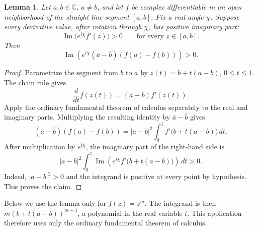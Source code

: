 \documentclass[11pt,a4paper]{article}
\newtheorem{lemma}[theorem]{Lemma}
\theoremstyle{definition}
\theoremstyle{remark}
\numberwithin{equation}{section}
\begin{document}
\begin{lemma}\label{thm:sector-difference}
Let $a,b\in\mathbb C$, $a\ne b$, and let $f$ be complex differentiable in an open neighborhood of the straight line segment $[a,b]$. Fix a real angle $\chi$. Suppose every derivative value, after rotation through $\chi$, has positive imaginary part:
\[
 \operatorname{Im}\bigl(e^{i\chi}f'(z)\bigr)>0
 \qquad\text{for every }z\in[a,b].
\]
Then
\[
 \operatorname{Im}\!\left(e^{i\chi}
          (\bar a-\bar b)(f(a)-f(b))\right)>0.
\]
\end{lemma}
\begin{proof}
Parametrize the segment from $b$ to $a$ by $z(t)=b+t(a-b)$, $0\le t\le1$. The chain rule gives
\[
 \frac{d}{dt}f(z(t))=(a-b)f'(z(t)).
\]
Apply the ordinary fundamental theorem of calculus separately to the real and imaginary parts. Multiplying the resulting identity by $\bar a-\bar b$ gives
\begin{equation}\label{eq:sector-difference}
 (\bar a-\bar b)(f(a)-f(b))
 =|a-b|^2\int_0^1 f'\bigl(b+t(a-b)\bigr)\,dt.
\end{equation}
After multiplication by $e^{i\chi}$, the imaginary part of the right-hand side is
\[
 |a-b|^2\int_0^1
 \operatorname{Im}\!\left(e^{i\chi}f'\bigl(b+t(a-b)\bigr)\right)\,dt>0.
\]
Indeed, $|a-b|^2>0$ and the integrand is positive at every point by hypothesis. This proves the claim.
\end{proof}
Below we use the lemma only for $f(z)=z^m$. The integrand is then $m(b+t(a-b))^{m-1}$, a polynomial in the real variable $t$. This application therefore uses only the ordinary fundamental theorem of calculus.
\end{document}
